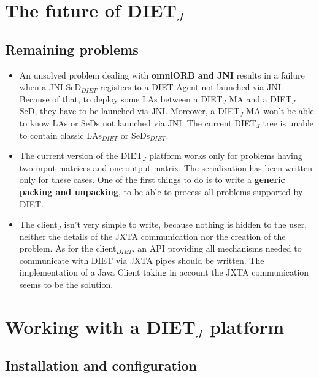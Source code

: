 \section{The future of DIET$_{J}$}
\label{sec:future}

\subsection{Remaining problems}
\label{ssec:remainingpbs}

\begin{itemize}
\item{An unsolved problem dealing with \textbf{omniORB and JNI}
    results in a failure when a JNI SeD$_{DIET}$ registers to a DIET
    Agent not launched via JNI. Because of that, to deploy some LAs
    between a DIET$_{J}$ MA and a DIET$_{J}$ SeD, they have to
    be launched via JNI.  Moreover, a DIET$_{J}$ MA won't be able
    to know LAs or SeDs not launched via JNI.  The current
    DIET$_{J}$ tree is unable to contain classic LAs$_{DIET}$ or
    SeDs$_{DIET}$.}
  
\item{The current version of the DIET$_{J}$ platform works only for
    problems having two input matrices and one output matrix. The
    serialization has been written only for these cases. One of the
    first things to do is to write a \textbf{generic packing and
      unpacking}, to be able to process all problems supported
    by DIET.}
\item{The client$_{J}$ isn't very simple to write, because nothing is
    hidden to the user, neither the details of the JXTA communication
    nor the creation of the problem. As for the client$_{DIET}$, an
    API providing all mechanisms needed to communicate with DIET via
    JXTA pipes should be written. The implementation of a Java Client
    taking in account the JXTA communication seems to be the solution.}

\end{itemize}

\section{Working with a DIET$_{J}$ platform}
\label{sec:workwithjxta}

\subsection{Installation and configuration}
\label{ssec:installjxta}

